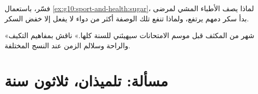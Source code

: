 \begin{exercise}[$\star\star\star$]\label{exo:g10:sport-and-health:14}
فسّر، باستعمال \cref{ex:g10:sport-and-health:sugar}، لماذا يصف
الأطباء المشي لمرضى بدأ سكر دمهم يرتفع، ولماذا تنفع تلك الوصفة أكثر
من دواء لا يفعل إلا خفض السكر.
\end{exercise}

\begin{exercise}[$\star\star\star$]\label{exo:g10:sport-and-health:15}
«شهر من  المكثف قبل موسم الامتحانات سيهيئني للسنة كلها.» ناقش
بمفاهيم التكيف والراحة وسلالم الزمن عند النسج المختلفة.
\end{exercise}

\section{مسألة: تلميذان، ثلاثون سنة}

